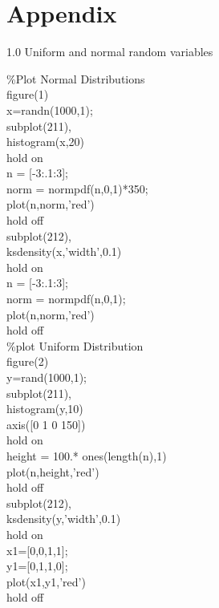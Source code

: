 \documentclass[twoside,twocolumn]{article}
\begin{document}
\section{Appendix}
\begin{large}
1.0 Uniform and normal random variables
\end{large}
\newline
\begin{itshape}
\%Plot Normal Distributions\\
figure(1)\\
x=randn(1000,1);\\
subplot(211),\\
histogram(x,20)\\
hold on\\
n = [-3:.1:3];\\
norm = normpdf(n,0,1)*350;\\
plot(n,norm,'red')\\
hold off\\
subplot(212),\\
ksdensity(x,'width',0.1)\\
hold on\\
n = [-3:.1:3];\\
norm = normpdf(n,0,1);\\
plot(n,norm,'red')\\
hold off\\

\%plot Uniform Distribution\\
figure(2)\\
y=rand(1000,1);\\
subplot(211),\\
histogram(y,10)\\
axis([0 1 0 150])\\
hold on\\
height = 100.* ones(length(n),1)\\
plot(n,height,'red')\\
hold off\\
subplot(212),\\
ksdensity(y,'width',0.1)\\
hold on\\
x1=[0,0,1,1];\\
y1=[0,1,1,0];\\
plot(x1,y1,'red')\\
hold off\\


\end{itshape}
\end{document}
